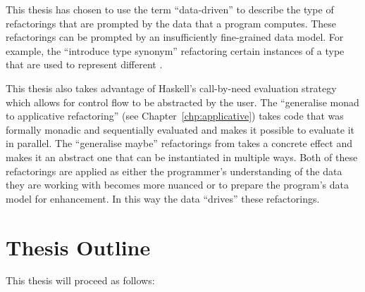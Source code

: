 This thesis has chosen to use the term ``data-driven'' to describe the type of refactorings that are prompted by the data that a program computes. These refactorings can be prompted by an insufficiently fine-grained data model. For example, the ``introduce type synonym'' refactoring \DIFdelbegin {}\DIFdelend \DIFaddbegin {}\DIFaddend certain instances of a type that are used to represent different \DIFdelbegin {}\DIFdelend \DIFaddbegin {}\DIFaddend .

This thesis also takes advantage of Haskell's call-by-need evaluation strategy which allows for control flow to be abstracted by the user. The ``generalise monad to applicative refactoring'' (see Chapter~\ref{chp:applicative}) takes code that was formally monadic and sequentially evaluated and makes it possible to evaluate it in parallel. The ``generalise maybe'' refactorings from \DIFdelbegin {}\DIFdelend \DIFaddbegin {}\DIFaddend takes a concrete effect and makes it an abstract one that can be instantiated in multiple ways. Both of these refactorings are applied as either the programmer's understanding of the data they are working with becomes more nuanced or to prepare the program's data model for enhancement. In this way the data ``drives'' these refactorings.

\section{Thesis Outline}

This thesis will proceed as follows:


\DIFaddbegin \textbf{}




